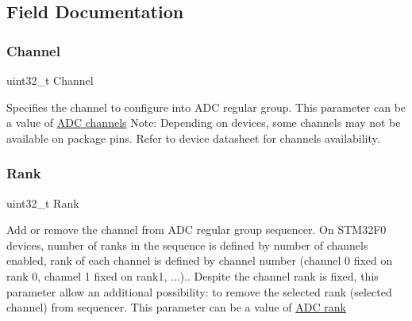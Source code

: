 \subsection{Field Documentation}
\mbox{\label{struct_a_d_c___channel_conf_type_def_ae82bf9242a014164f9f6907f29782c44}} 
\subsubsection{\texorpdfstring{Channel}{Channel}}
{\footnotesize\ttfamily uint32\+\_\+t Channel}

Specifies the channel to configure into A\+DC regular group. This parameter can be a value of \hyperlink{group___a_d_c__channels}{A\+DC channels} Note\+: Depending on devices, some channels may not be available on package pins. Refer to device datasheet for channels availability. \mbox{\label{struct_a_d_c___channel_conf_type_def_ab926cc2abe3d17aeaf637d499aef6b1b}} 
\subsubsection{\texorpdfstring{Rank}{Rank}}
{\footnotesize\ttfamily uint32\+\_\+t Rank}

Add or remove the channel from A\+DC regular group sequencer. On S\+T\+M32\+F0 devices, number of ranks in the sequence is defined by number of channels enabled, rank of each channel is defined by channel number (channel 0 fixed on rank 0, channel 1 fixed on rank1, ...).. Despite the channel rank is fixed, this parameter allow an additional possibility\+: to remove the selected rank (selected channel) from sequencer. This parameter can be a value of \hyperlink{group___a_d_c__rank}{A\+DC rank} \mbox{\label{struct_a_d_c___channel_conf_type_def_a72e649848c8a14f0adcba783cfb3b2cd}} 
